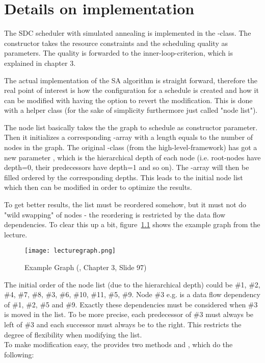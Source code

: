\chapter{Details on implementation}

The SDC scheduler with simulated annealing is implemented in the -class. The constructor takes the resource constraints and the scheduling quality as parameters. The quality is forwarded to the inner-loop-criterion, which is explained in chapter 3.\par
The actual implementation of the SA algorithm is straight forward, therefore the real point of interest is how the configuration for a schedule is created and how it can be modified with having the option to revert the modification. This is done with a helper class  (for the sake of simplicity furthermore just called "node list").\par
The node list basically takes the the graph to schedule as constructor parameter. Then it initializes a corresponding -array with a length equals to the number of nodes in the graph. The original -class (from the high-level-framework) has got a new parameter , which is the hierarchical depth of each node (i.e. root-nodes have depth=0, their predecessors have depth=1 and so on). The -array will then be filled ordered by the corresponding depths. This leads to the initial node list which then can be modified in order to optimize the results.\par
To get better results, the list must be reordered somehow, but it must not do "wild swapping" of nodes - the reordering is restricted by the data flow dependencies. To clear this up a bit, figure~\ref{fig:lecturegraph} shows the example graph from the lecture.
\begin{figure}
	\centering
	\texttt{[image: lecturegraph.png]}
	\caption{Example Graph (\cite{Hochberger2017}, Chapter 3, Slide 97)}
	\label{fig:lecturegraph}
\end{figure}

The initial order of the node list (due to the hierarchical depth) could be \#1, \#2, \#4, \#7, \#8, \#3, \#6, \#10, \#11, \#5, \#9. Node \#3 e.g. is a data flow dependency of \#1, \#2, \#5 and \#9. Exactly these dependencies must be considered when \#3 is moved in the list. To be more precise, each predecessor of \#3 must always be left of \#3 and each successor must always be to the right. This restricts the degree of flexibility when modifying the list.\\
To make modification easy, the  provides two methods  and , which do the following:


